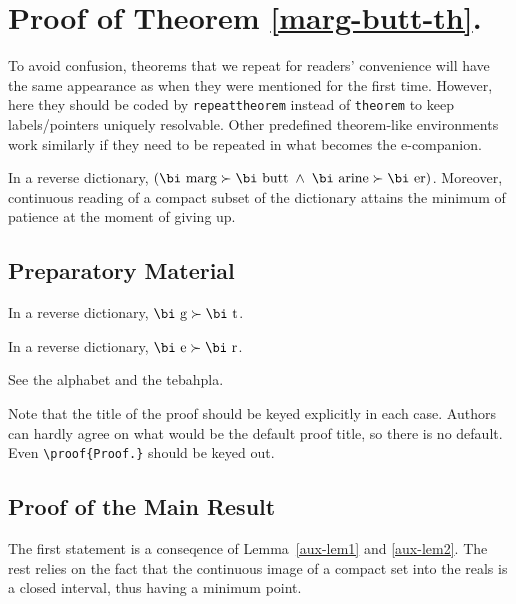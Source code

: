\documentclass[mnsc,blindrev]{informs3}
\begin{document}
\section{Proof of Theorem \ref{marg-butt-th}.}

To avoid confusion, theorems that we repeat for readers' convenience
will have the same appearance as when they were mentioned for the first
time. However, here they should be coded by \verb+repeattheorem+ instead
of \verb+theorem+ to keep labels/pointers uniquely resolvable. Other predefined theorem-like
environments work similarly if they need to be repeated in what becomes the \mbox{e-companion.}


\begin{repeattheorem}[Theorem 1.]
In a reverse dictionary, $(\mbox{\bi marg}\succ\mbox{\bi butt\/}\; \land\;  
\mbox{\bi arine}\succ\mbox{\bi er})$.
Moreover, continuous reading of a compact subset of the dictionary
attains the minimum of patience at the moment of giving up.
\end{repeattheorem}

\subsection{Preparatory Material}

\begin{lemma}
\label{aux-lem1}
In a reverse dictionary, $\mbox{\bi g}\succ\mbox{\bi t\/}$.
\end{lemma}

\begin{lemma}
\label{aux-lem2}
In a reverse dictionary, $\mbox{\bi e}\succ\mbox{\bi r\/}$.
\end{lemma}

 See the alphabet and the tebahpla.\Halmos
\endproof

\begin{remark} 
Note that the title of the proof should be keyed
explicitly in each case. Authors can hardly agree on what would be the
default proof title, so there is no default. Even \verb+\proof{Proof.}+ should be keyed out. 
\end{remark}


\subsection{Proof of the Main Result}

 The first statement is a conseqence of
Lemma~\ref{aux-lem1} and \ref{aux-lem2}. The rest relies on the fact that the continuous
image of a compact set into the reals is a closed interval, thus having
a minimum point.\Halmos 
\endproof
\end{document}
